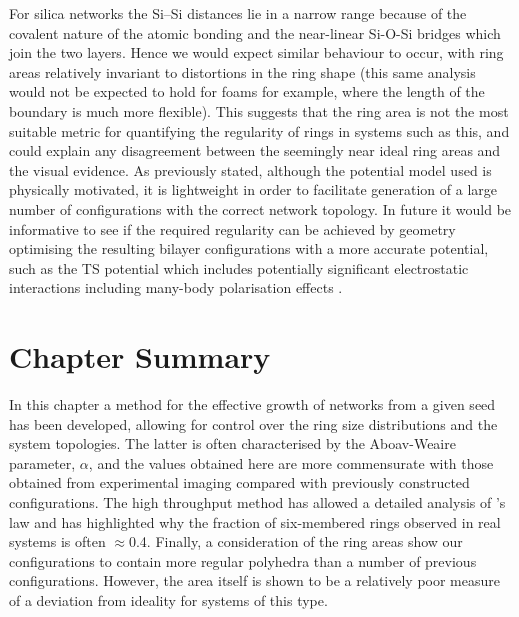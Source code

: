 For silica networks the Si\---Si distances lie in a narrow range because of the covalent nature of the atomic bonding and the near-linear Si-O-Si bridges
which join the two layers. 
Hence we would expect similar behaviour to occur, with ring areas relatively invariant to distortions in the ring shape (this same analysis would not be expected to hold for foams for example, where the length of the boundary is much more flexible). 
This suggests that the ring area is not the most suitable metric for quantifying the regularity of rings in systems such as this, and could explain any disagreement between the seemingly near ideal ring areas and the visual evidence. 
As previously stated, although the potential model used is physically motivated, it is lightweight in order to facilitate generation of a large number of configurations with the correct network topology. 
In future it would be informative to see if the required regularity can be achieved by geometry optimising the resulting bilayer configurations with a more accurate potential, such as the TS potential which includes potentially significant electrostatic interactions including many-body polarisation effects \cite{Tangney2002}.

\section{Chapter Summary}

In this chapter a method for the effective growth of \td{} networks from a given seed has been developed, allowing for control over the ring size distributions and the system topologies. 
The latter is often characterised by the Aboav-Weaire parameter, $\alpha$, and
the values obtained here are more commensurate with those obtained
from experimental imaging compared with previously constructed configurations.
The high throughput method has allowed a detailed analysis of \lm's
law and has highlighted why the fraction of six-membered rings observed
in real systems is often $\approx$0.4. 
Finally, a consideration of the ring areas show our configurations to contain more regular polyhedra than a number of previous configurations. 
However, the area itself is shown to be a relatively poor measure of a deviation from ideality for systems of this type.



